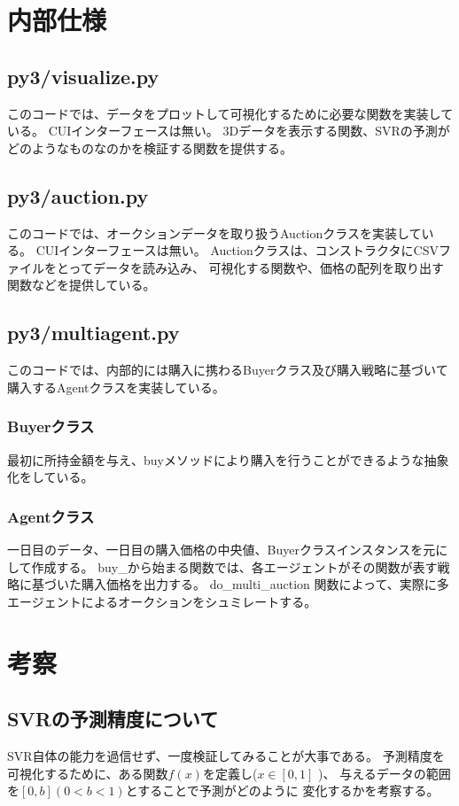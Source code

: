\documentclass[]{jsarticle}
\begin{document}
\section{内部仕様}
\subsection{py3/visualize.py}
このコードでは、データをプロットして可視化するために必要な関数を実装している。
CUIインターフェースは無い。
3Dデータを表示する関数、SVRの予測がどのようなものなのかを検証する関数を提供する。

\subsection{py3/auction.py}
このコードでは、オークションデータを取り扱うAuctionクラスを実装している。
CUIインターフェースは無い。
Auctionクラスは、コンストラクタにCSVファイルをとってデータを読み込み、
可視化する関数や、価格の配列を取り出す関数などを提供している。


\subsection{py3/multiagent.py}
このコードでは、内部的には購入に携わるBuyerクラス及び購入戦略に基づいて購入するAgentクラスを実装している。
\subsubsection{Buyerクラス}
最初に所持金額を与え、buyメソッドにより購入を行うことができるような抽象化をしている。
\subsubsection{Agentクラス}
一日目のデータ、一日目の購入価格の中央値、Buyerクラスインスタンスを元にして作成する。
buy\_から始まる関数では、各エージェントがその関数が表す戦略に基づいた購入価格を出力する。
do\_multi\_auction 関数によって、実際に多エージェントによるオークションをシュミレートする。

\section{考察}
\subsection{SVRの予測精度について}
SVR自体の能力を過信せず、一度検証してみることが大事である。
予測精度を可視化するために、ある関数$f(x)$を定義し($x \in [0,1]$ )、
与えるデータの範囲を$[0,b](0<b<1)$とすることで予測がどのように
変化するかを考察する。
\newpage
\end{document}
